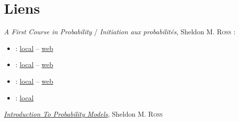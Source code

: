 \chapter*{Liens}

\emph{A First Course in Probability} / \emph{Initiation aux probabilités}, Sheldon M. \textsc{Ross} :
\newlength{\longueur}
\begin{itemize}
	\item {} : 
		\href{ross/4EdFr.pdf}{local} -- 
		\href{https://docplayer.fr/2602735-Initiation-aux-probabilites.html}{web}
	\item {} :
		\href{ross/7EdSolEn.pdf}{local} -- \href{https://www.studocu.com/row/document/yildiz-teknik-ueniversitesi/ergonomi/lecture-notes/a-first-course-in-probability-7ed-solution-manual-prentice-hall-147s-sheldon-ross/7242179/view}{web}
	\item {} :
		\href{ross/8EdEn.pdf}{local} --
		\href{http://julio.staff.ipb.ac.id/files/2015/02/Ross_8th_ed_English.pdf}{web}
	\item {} :
		\href{ross/10EdEn.pdf}{local}
\end{itemize}

\href{ross/introductionToProbabilityModels.pdf}{\emph{Introduction To Probability Models}}, Sheldon M. \textsc{Ross}